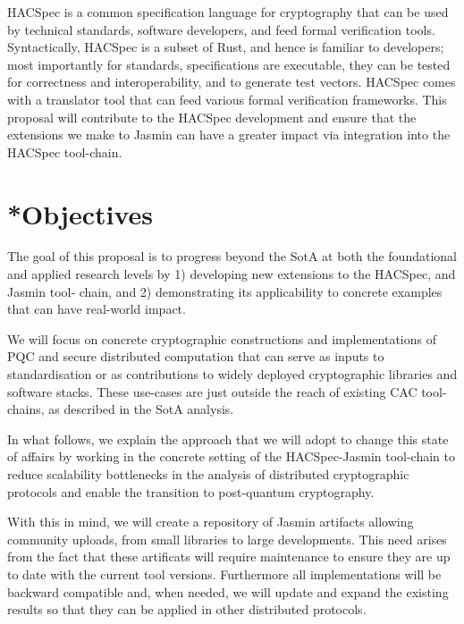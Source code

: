 \documentclass[preprint]{iacrtrans}
\begin{document}
    \par HACSpec \cite{HACS} is a common specification language for cryptography that can be used by technical standards, software developers, and feed formal verification tools. Syntactically, HACSpec is a subset of Rust, and hence is familiar to developers; most importantly for standards, specifications are executable, they can be tested for correctness and interoperability, and to generate test vectors. 
    HACSpec comes with a translator tool that can feed various formal verification frameworks.
    This proposal will contribute to the HACSpec development and ensure that the extensions we make to Jasmin can have a greater impact via integration into the HACSpec tool-chain.  


\section{*Objectives}

    \hspace{4mm} The goal of this proposal is to progress beyond the SotA at both the foundational and applied research levels by 1) developing new extensions to the HACSpec, and Jasmin tool- chain, and 2) demonstrating its applicability to concrete examples that can have real-world impact.

    \par We will focus on concrete cryptographic constructions and implementations of PQC and secure distributed computation that can serve as inputs to standardisation or as contributions to widely deployed cryptographic libraries and software stacks. These use-cases are just outside the reach of existing CAC tool-chains, as described in the SotA analysis.

    In what follows, we explain the approach that we will adopt to change this state of affairs by working in the concrete setting of the HACSpec-Jasmin tool-chain to reduce scalability bottlenecks in the analysis of distributed cryptographic protocols and enable the transition to post-quantum cryptography.

    \par With this in mind, we will create a repository of Jasmin artifacts allowing community uploads, from small libraries to large developments. This need arises from the fact that these artificats will require maintenance to ensure they are up to date with the current tool versions. Furthermore all implementations will be backward compatible and, when needed, we will update and expand the existing results so that they can be applied in other distributed protocols.
\end{document}
